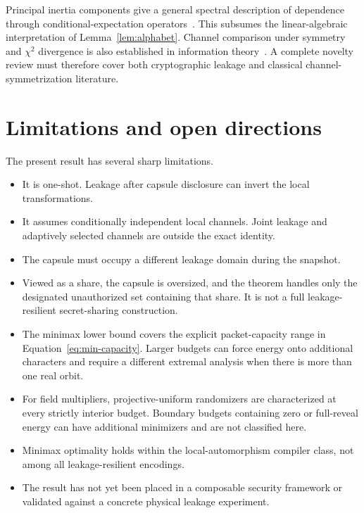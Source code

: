 \documentclass[11pt]{article}
\theoremstyle{definition}
\newcommand{\chitwo}{\chi^2}
\begin{document}
Principal inertia components give a general spectral description of dependence
through conditional-expectation operators~\cite{calmon17}.  This subsumes the
linear-algebraic interpretation of Lemma~\ref{lem:alphabet}.  Channel comparison
under symmetry and $\chitwo$ divergence is also established in information
theory~\cite{makur16}.  A complete novelty review must therefore cover both
cryptographic leakage and classical channel-symmetrization literature.

\section{Limitations and open directions}

The present result has several sharp limitations.
\begin{itemize}
    \item It is one-shot.  Leakage after capsule disclosure can invert the local
          transformations.
    \item It assumes conditionally independent local channels.  Joint leakage and
          adaptively selected channels are outside the exact identity.
    \item The capsule must occupy a different leakage domain during the snapshot.
    \item Viewed as a share, the capsule is oversized, and the theorem handles only
          the designated unauthorized set containing that share.  It is not a
          full leakage-resilient secret-sharing construction.
    \item The minimax lower bound covers the explicit packet-capacity range in
          Equation~\eqref{eq:min-capacity}.  Larger budgets can force energy onto
          additional characters and require a different extremal analysis when
          there is more than one real orbit.
    \item For field multipliers, projective-uniform randomizers are characterized
          at every strictly interior budget.  Boundary budgets containing zero
          or full-reveal energy can have additional minimizers and are not
          classified here.
    \item Minimax optimality holds within the local-automorphism compiler class,
          not among all leakage-resilient encodings.
    \item The result has not yet been placed in a composable security framework or
          validated against a concrete physical leakage experiment.
\end{itemize}
\end{document}
